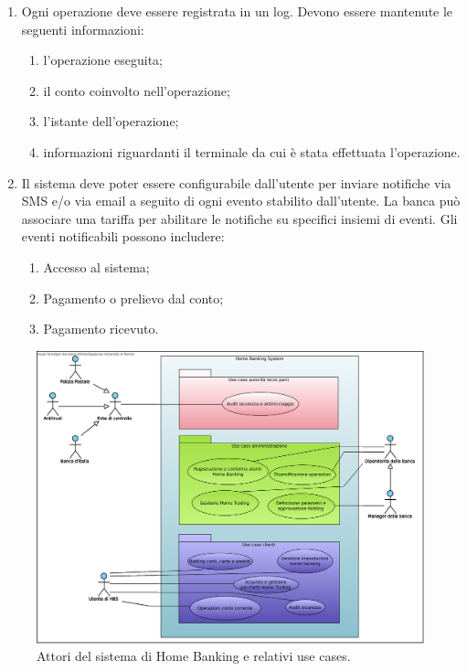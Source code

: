 \documentclass[10pt]{softeng} %
\begin{document}
\begin{enumerate}
\begin{enumerate}
		\end{enumerate}
	\item Ogni operazione deve essere registrata in un log.
		Devono essere mantenute le seguenti informazioni:
		\begin{enumerate}
			\item l'operazione eseguita;
			\item il conto coinvolto nell'operazione;
			\item l'istante dell'operazione;
			\item informazioni riguardanti il terminale da cui \`e stata effettuata l'operazione.
		\end{enumerate}
	\item Il sistema deve poter essere configurabile dall'utente per inviare notifiche via SMS e/o via email a seguito di ogni evento stabilito dall'utente.
		La banca pu\`o associare una tariffa per abilitare le notifiche su specifici insiemi di eventi.
		Gli eventi notificabili possono includere:
		\begin{enumerate}
			\item Accesso al sistema;
			\item Pagamento o prelievo dal conto;
			\item Pagamento ricevuto.
		\end{enumerate}
\end{enumerate}


\nocite{banca_italia}
\printcustombib{}


\begin{figure}[hbt]
	\centering
	\includegraphics[width=\textwidth]{Images/Home_Banking_inception_use_cases.eps}
	\caption{Attori del sistema di Home Banking e relativi use cases.}
	\label{fig:inception_use_cases}
\end{figure}
\end{document}
